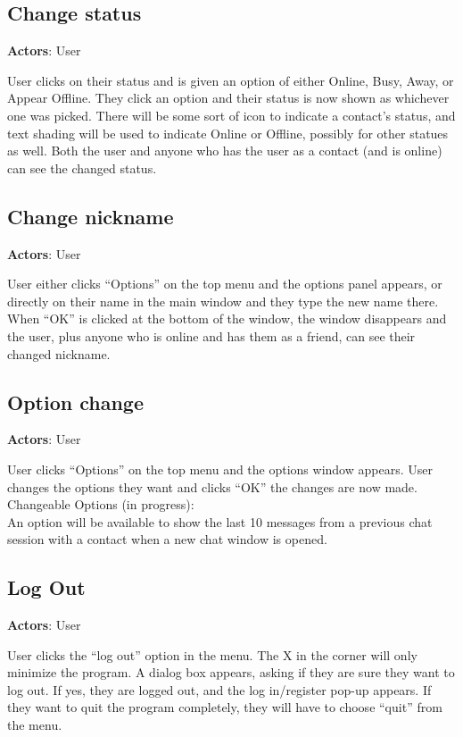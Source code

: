 \subsection{Change status}

{\bf Actors}: User

User clicks on their status and is given an option of either Online, Busy, Away, or Appear Offline. They click an option and their status is now shown as whichever one was picked. There will be some sort of icon to indicate a contact's status, and text shading will be used to indicate Online or Offline, possibly for other statues as well. Both the user and anyone who has the user as a contact (and is online) can see the changed status.

\subsection{Change nickname}

{\bf Actors}: User

User either clicks ``Options'' on the top menu and the options panel appears, or directly on their name in the main window and they type the new name there. When ``OK'' is clicked at the bottom of the window, the window disappears and the user, plus anyone who is online and has them as a friend, can see their changed nickname.

\subsection{Option change}

{\bf Actors}: User

User clicks ``Options'' on the top menu and the options window appears. User changes the options they want and clicks ``OK'' the changes are now made. \\
Changeable Options (in progress):\\
An option will be available to show the last 10 messages from a previous chat session with a contact when a new chat window is opened.

\subsection{Log Out}

{\bf Actors}: User

User clicks the ``log out'' option in the menu. The X in the corner will only minimize the program. A dialog box appears, asking if they are sure they want to log out. If yes, they are logged out, and the log in/register pop-up appears. If they want to quit the program completely, they will have to choose ``quit'' from the menu.

